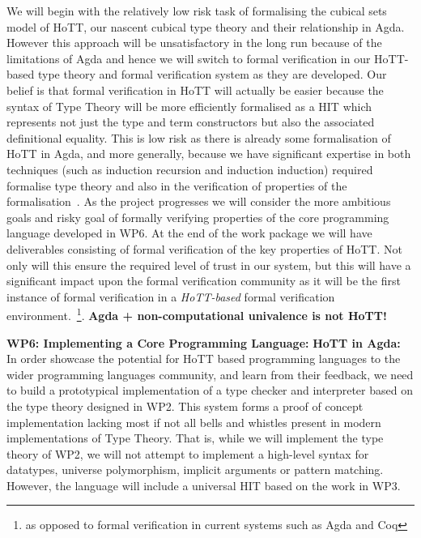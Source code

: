 \documentclass[a4paper,11pt]{article}
\begin{document}

We will begin with the relatively low risk task of formalising the
cubical sets model of HoTT, our nascent cubical type theory and their
relationship in Agda. However this approach will be unsatisfactory in
the long run because of the limitations of Agda and hence we will
switch to formal verification in our HoTT-based type theory and formal
verification system as they are developed. Our belief is that formal
verification in HoTT will actually be easier because the syntax of
Type Theory will be more efficiently formalised as a HIT which
represents not just the type and term constructors but also the
associated definitional equality. This is low risk as there is already
some formalisation of HoTT in Agda, and more generally, because we
have significant expertise in both techniques (such as induction
recursion and induction induction) required formalise type theory and
also in the verification of properties of the formalisation~\cite{}.
As the project progresses we will consider the more ambitious goals
and risky goal of formally verifying properties of the core programming
language developed in WP6. At the end of the work package we will have
deliverables consisting of formal verification of the key properties
of HoTT. Not only will this ensure the required level of trust in our
system, but this will have a significant impact upon the formal
verification community as it will be the first instance of formal
verification in a {\em HoTT-based} formal verification
environment.~\footnote{as opposed to formal verification in current
  systems such as Agda and Coq}. {\bf Agda + non-computational
  univalence is not HoTT!}
  





{\bf WP6: Implementing a Core Programming Language:} {\bf HoTT in
  Agda:} In order showcase the potential for HoTT based programming
languages to the wider programming languages community, and learn from
their feedback, we need to build a prototypical implementation of a
type checker and interpreter based on the type theory designed in WP2.
This system forms a proof of concept implementation lacking most if
not all bells and whistles present in modern implementations of Type
Theory. That is, while we will implement the type theory of WP2, we
will not attempt to implement a high-level syntax for datatypes,
universe polymorphism, implicit arguments or pattern
matching. However, the language will include a universal HIT based on
the work in WP3.
\end{document}
